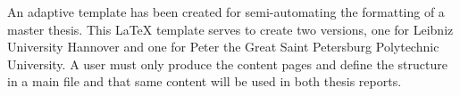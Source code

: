 An adaptive template has been created for semi-automating the formatting of a master thesis. This LaTeX template serves to create two versions, one for Leibniz University Hannover and one for Peter the Great Saint Petersburg Polytechnic University. A user must only produce the content pages and define the structure in a main file and that same content will be used in both thesis reports.